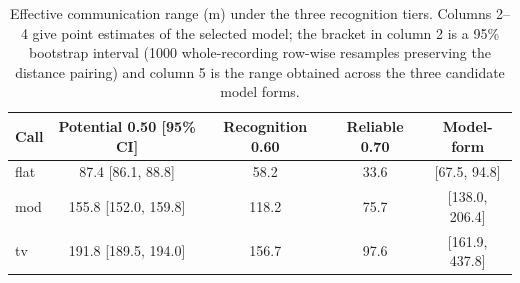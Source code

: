 \begin{table}[!ht]
\centering
\caption{Effective communication range (m) under the three recognition tiers. Columns
2--4 give point estimates of the selected model; the bracket in column 2 is a 95\%
bootstrap interval (1000 whole-recording row-wise resamples preserving the distance
pairing) and column 5 is the range obtained across the three candidate model forms.}
\label{tab:range}
\footnotesize
\begin{tabular}{lcccc}
\toprule
Call & Potential 0.50 [95\% CI] & Recognition 0.60 & Reliable 0.70 & Model-form\\
\midrule
flat & 87.4 [86.1, 88.8] & 58.2 & 33.6 & [67.5, 94.8]\\
mod & 155.8 [152.0, 159.8] & 118.2 & 75.7 & [138.0, 206.4]\\
tv & 191.8 [189.5, 194.0] & 156.7 & 97.6 & [161.9, 437.8]\\
\bottomrule
\end{tabular}
\end{table}
